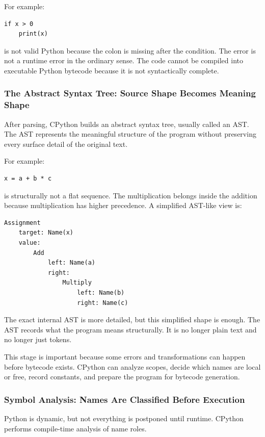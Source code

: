 For example:

\begin{verbatim}
if x > 0
    print(x)
\end{verbatim}

is not valid Python because the colon is missing after the condition. The error is not a runtime error in the ordinary sense. The code cannot be compiled into executable Python bytecode because it is not syntactically complete.

\subsubsection{The Abstract Syntax Tree: Source Shape Becomes Meaning Shape}

After parsing, CPython builds an abstract syntax tree, usually called an AST. The AST represents the meaningful structure of the program without preserving every surface detail of the original text.

For example:

\begin{verbatim}
x = a + b * c
\end{verbatim}

is structurally not a flat sequence. The multiplication belongs inside the addition because multiplication has higher precedence. A simplified AST-like view is:

\begin{verbatim}
Assignment
    target: Name(x)
    value:
        Add
            left: Name(a)
            right:
                Multiply
                    left: Name(b)
                    right: Name(c)
\end{verbatim}

The exact internal AST is more detailed, but this simplified shape is enough. The AST records what the program means structurally. It is no longer plain text and no longer just tokens.

This stage is important because some errors and transformations can happen before bytecode exists. CPython can analyze scopes, decide which names are local or free, record constants, and prepare the program for bytecode generation.

\subsubsection{Symbol Analysis: Names Are Classified Before Execution}

Python is dynamic, but not everything is postponed until runtime. CPython performs compile-time analysis of name roles.


